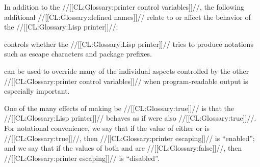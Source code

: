 
In addition to the //[[CL:Glossary:printer control variables]]//, 
the following additional //[[CL:Glossary:defined names]]// 
relate to or affect the behavior of the //[[CL:Glossary:Lisp printer]]//:



 controls whether the //[[CL:Glossary:Lisp printer]]//
tries to produce notations such as escape characters and package prefixes.

 can be used to override
many of the individual aspects controlled by the other 
//[[CL:Glossary:printer control variables]]// when program-readable output
is especially important.

One of the many effects of making  be //[[CL:Glossary:true]]//
is that the //[[CL:Glossary:Lisp printer]]// behaves as if  were also //[[CL:Glossary:true]]//.
For notational convenience, we say that 
if the value of either  or  is //[[CL:Glossary:true]]//, 
then //[[CL:Glossary:printer escaping]]// is ``enabled'';
and we say that
if the values of both  and  are //[[CL:Glossary:false]]//, 
then //[[CL:Glossary:printer escaping]]// is ``disabled''.


\endsubsubsubsection%

\endsubsubsection%

\endsubsection%

























